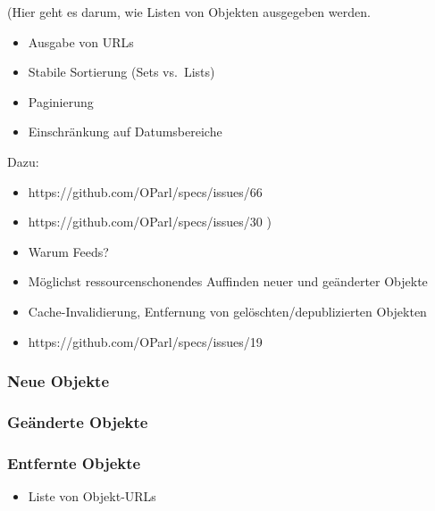 \documentclass[,a4paper]{article}
\begin{document}
(Hier geht es darum, wie Listen von Objekten ausgegeben werden.

\begin{itemize}
\item
  Ausgabe von URLs
\item
  Stabile Sortierung (Sets vs.~Lists)
\item
  Paginierung
\item
  Einschränkung auf Datumsbereiche
\end{itemize}

Dazu:

\begin{itemize}
\item
  https://github.com/OParl/specs/issues/66
\item
  https://github.com/OParl/specs/issues/30 )
\end{itemize}


\begin{itemize}
\item
  Warum Feeds?
\item
  Möglichst ressourcenschonendes Auffinden neuer und geänderter Objekte
\item
  Cache-Invalidierung, Entfernung von gelöschten/depublizierten Objekten
\item
  https://github.com/OParl/specs/issues/19
\end{itemize}

\subsubsection{Neue Objekte}

\subsubsection{Geänderte Objekte}

\subsubsection{Entfernte Objekte}

\begin{itemize}
\item
  Liste von Objekt-URLs
\end{itemize}
\end{document}
